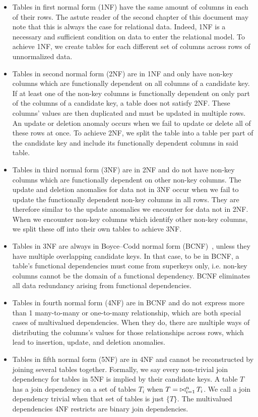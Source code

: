 \begin{itemize}
\item Tables in first normal form (1NF) have the same amount of columns in each of their rows. The astute reader of the second chapter of this document may note that this is always the case for relational data. Indeed, 1NF is a necessary and sufficient condition on data to enter the relational model. To achieve 1NF, we create tables for each different set of columns across rows of unnormalized data.
\item Tables in second normal form (2NF) are in 1NF and only have non-key columns which are functionally dependent on all columns of a candidate key. If at least one of the non-key columns is functionally dependent on only part of the columns of a candidate key, a table does not satisfy 2NF. These columns' values are then duplicated and must be updated in multiple rows. An update or deletion anomaly occurs when we fail to update or delete all of these rows at once. To achieve 2NF, we split the table into a table per part of the candidate key and include its functionally dependent columns in said table.
\item Tables in third normal form (3NF) are in 2NF and do not have non-key columns which are functionally dependent on other non-key columns. The update and deletion anomalies for data not in 3NF occur when we fail to update the functionally dependent non-key columns in all rows. They are therefore similar to the update anomalies we encounter for data not in 2NF. When we encounter non-key columns which identify other non-key columns, we split these off into their own tables to achieve 3NF.
\item Tables in 3NF are always in Boyce--Codd normal form (BCNF)~\citep{DBLP:conf/sigmod/Heath71}, unless they have multiple overlapping candidate keys. In that case, to be in BCNF, a table's functional dependencies must come from superkeys only, i.e. non-key columns cannot be the domain of a functional dependency. BCNF eliminates all data redundancy arising from functional dependencies.
\item Tables in fourth normal form (4NF) are in BCNF and do not express more than 1 many-to-many or one-to-many relationship, which are both special cases of multivalued dependencies. When they do, there are multiple ways of distributing the columns's values for those relationships across rows, which lead to insertion, update, and deletion anomalies.
\item Tables in fifth normal form (5NF) are in 4NF and cannot be reconstructed by joining several tables together. Formally, we say every non-trivial join dependency for tables in 5NF is implied by their candidate keys. A table \(T\) has a join dependency on a set of tables \(T_i\) when \(T = \operatorname*{\bowtie}_{i=1}^{n} T_i\). We call a join dependency trivial when that set of tables is just \(\{ T \}\). The multivalued dependencies 4NF restricts are binary join dependencies.

\end{itemize}
